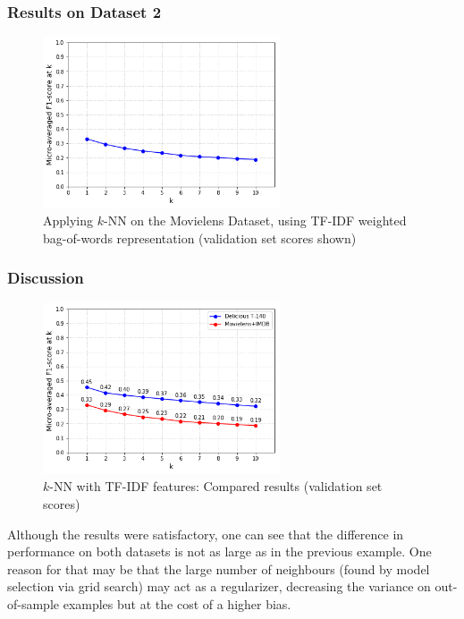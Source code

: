 \subsubsection{Results on Dataset 2}

\begin{figure}[H]
    \centering
    \includegraphics[width=7cm]{chapters/05_experiments/images/knn-tfidf-movielens.png}
    \caption{Applying $k$-NN on the Movielens Dataset, using TF-IDF weighted bag-of-words representation (validation set scores shown)}
    \label{fig:knn__movielens}
\end{figure}

\subsubsection{Discussion}

\begin{figure}[H]
    \centering
    \includegraphics[width=7cm]{chapters/05_experiments/images/proposal-1-compared-knn-tfidf.png}
    \caption{$k$-NN with TF-IDF features: Compared results (validation set scores)}
    \label{fig:compared_ovr_svm}
\end{figure}

Although the results were satisfactory, one can see that the difference in performance on both datasets is not as large as in the previous example. One reason for that may be that the large number of neighbours (found by model selection via grid search) may act as a regularizer, decreasing the variance on out-of-sample examples but at the cost of a higher bias.

